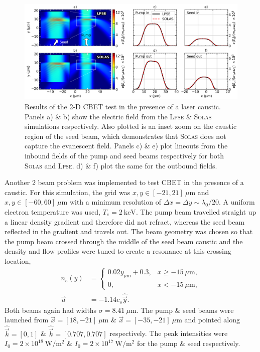 \begin{figure}[t!]
    \includegraphics[width=1.0\linewidth]{Numerics/Images/caustic_CBET_test.png}
    \centering
    \caption{Results of the 2-D \ac{CBET} test in the presence of a laser caustic.
    Panels a) \& b) show the electric field from the \textsc{Lpse} \& \textsc{Solas} simulations respectively.
    Also plotted is an inset zoom on the caustic region of the seed beam, which demonstrates that \textsc{Solas} does not capture the evanescent field.
    Panels c) \& e) plot lineouts from the inbound fields of the pump and seed beams respectively for both \textsc{Solas} and \textsc{Lpse}.
    d) \& f) plot the same for the outbound fields.}%
    \label{fig:SOLAS_CBET_test_caustics}
\end{figure}

Another 2 beam problem was implemented to test \ac{CBET} in the presence of a caustic.
For this simulation, the grid was $x,y \in [-21,21]\ \mu\text{m}$ and $x,y \in [-60,60]\ \mu\text{m}$ with a minimum resolution of $\Delta x = \Delta y \sim \lambda_0/20$.
A uniform electron temperature was used, $T_e=2\ \text{keV}$.
The pump beam travelled straight up a linear density gradient and therefore did not refract, whereas the seed beam reflected in the gradient and travels out.
The beam geometry was chosen so that the pump beam crossed through the middle of the seed beam caustic and the density and flow profiles were tuned to create a resonance at this crossing location,
\begin{align}
    n_e(y) &= 
    \begin{cases}
        0.02y_{\mu\text{m}} + 0.3, & x\geq -15\ \mu\text{m},\\
        0,              & x<-15\ \mu\text{m},
    \end{cases} \\
    \vec{u} &= -1.14 c_s \hat{\vec{y}}.
\end{align}
Both beams again had widths $\sigma=8.41\ \mu\text{m}$.
The pump \& seed beams were launched from $\vec{x}=[18,-21]\ \mu\text{m}$ \& $\vec{x}=[-35,-21]\ \mu\text{m}$ and pointed along $\hat{\vec{k}}=[0,1]$ \& $\hat{\vec{k}}=[0.707,0.707]$ respectively.
The peak intensities were $I_0=2\times10^{18}\ \text{W}/\text{m}^2$ \& $I_0=2\times10^{17}\ \text{W}/\text{m}^2$ for the pump \& seed respectively.

